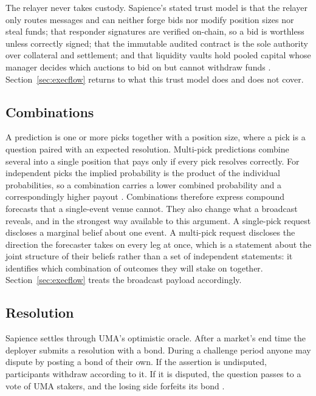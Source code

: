 The relayer never takes custody. Sapience's stated trust model is that the relayer only
routes messages and can neither forge bids nor modify position sizes nor steal funds; that
responder signatures are verified on-chain, so a bid is worthless unless correctly signed;
that the immutable audited contract is the sole authority over collateral and settlement;
and that liquidity vaults hold pooled capital whose manager decides which auctions to bid on
but cannot withdraw funds \cite{sapience2026docs}. Section~\ref{sec:execflow} returns to
what this trust model does and does not cover.

\subsection{Combinations}

A prediction is one or more picks together with a position size, where a pick is a question
paired with an expected resolution. Multi-pick predictions combine several into a single
position that pays only if every pick resolves correctly. For independent picks the implied
probability is the product of the individual probabilities, so a combination
carries a lower combined probability and a correspondingly higher payout
\cite{sapience2026docs}. Combinations therefore express compound forecasts that a
single-event venue cannot. They also change what a broadcast reveals, and in the strongest
way available to this argument. A single-pick request discloses a marginal belief about one
event. A multi-pick request discloses the direction the forecaster takes on every leg at
once, which is a statement about the joint structure of their beliefs rather than a set of
independent statements: it identifies which combination of outcomes they will stake on
together. Section~\ref{sec:execflow} treats the broadcast payload accordingly.

\subsection{Resolution}

Sapience settles through UMA's optimistic oracle. After a market's end time the deployer
submits a resolution with a bond. During a challenge period anyone may dispute by posting a
bond of their own. If the assertion is undisputed, participants withdraw according to it. If
it is disputed, the question passes to a vote of UMA stakers, and the losing side forfeits
its bond \cite{sapience2026docs,uma2026oracle}.

